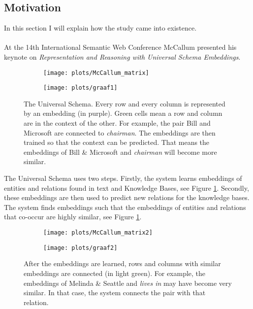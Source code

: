 \documentclass{article}
\begin{document}
 \subsection{Motivation}
 In this section I will explain how the study came into existence.
 \paragraph{}
 At the 14th International Semantic Web Conference McCallum presented his keynote on \emph{Representation and Reasoning with Universal Schema Embeddings}\cite{mccallumweblecture}. 
 
 \begin{figure}[H]
 \begin{subfigure}{.475\textwidth}
 \texttt{[image: plots/McCallum\_matrix]}
 \end{subfigure}
 \begin{subfigure}{0.475\textwidth}
 \texttt{[image: plots/graaf1]}
 \end{subfigure}
 \caption{The Universal Schema. Every row and every column is represented by an embedding (in purple). Green cells mean a row and column are in the context of the other. For example, the pair Bill and Microsoft are connected to \emph{chairman}.
 The embeddings are then trained so that the context can be predicted. That means the embeddings of Bill \& Microsoft and \emph{chairman} will become more similar.}
 \label{McCallum_matrix}
 \end{figure}

The Universal Schema uses two steps. Firstly, the system learns embeddings of entities and relations found in text and Knowledge Bases\cite{univeralschema}, see Figure \ref{McCallum_matrix}. Secondly, these embeddings are then used to predict new relations for the knowledge bases. The system finds embeddings such that the embeddings of entities and relations that co-occur are highly similar, see Figure \ref{McCallum_matrix}.

 \begin{figure}[H]
 \begin{subfigure}{0.475\textwidth}
 \texttt{[image: plots/McCallum\_matrix2]}
 \end{subfigure}
 \begin{subfigure}{0.475\textwidth}
 \texttt{[image: plots/graaf2]}
 \end{subfigure}
 \caption{After the embeddings are learned, rows and columns with similar embeddings are connected (in light green).
 For example, the embeddings of Melinda \& Seattle and \emph{lives in} may have become very similar. In that case, the system connects the pair with that relation.}
 \label{McCallum_matrix2}
 \end{figure}
 
\end{document}
